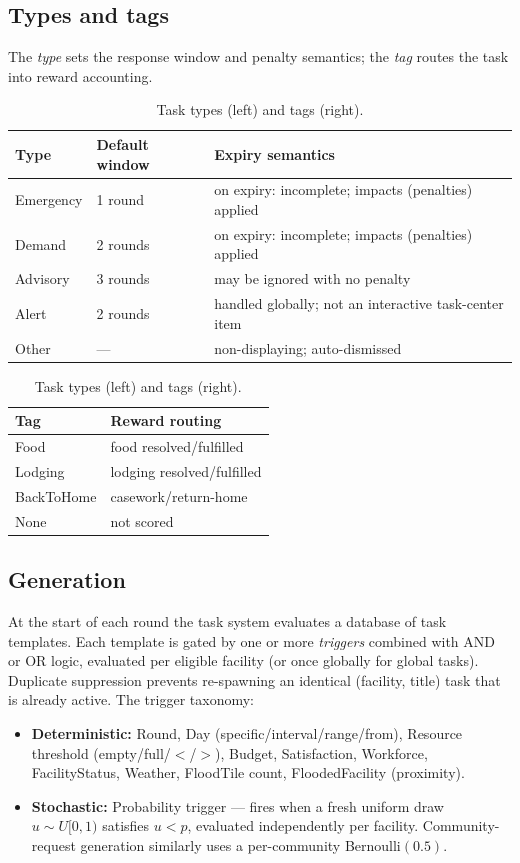 \documentclass[11pt]{article}
\begin{document}
\subsection{Types and tags}
The \emph{type} sets the response window and penalty semantics; the \emph{tag}
routes the task into reward accounting.

\begin{table}[h]
\centering\small
\begin{tabular}{@{}lll@{}}
\toprule
Type & Default window & Expiry semantics \\
\midrule
Emergency & 1 round & on expiry: incomplete; impacts (penalties) applied \\
Demand    & 2 rounds & on expiry: incomplete; impacts (penalties) applied \\
Advisory  & 3 rounds & may be ignored with no penalty \\
Alert     & 2 rounds & handled globally; not an interactive task-center item \\
Other     & --- & non-displaying; auto-dismissed \\
\bottomrule
\end{tabular}
\quad
\begin{tabular}{@{}ll@{}}
\toprule
Tag & Reward routing \\
\midrule
Food & food resolved/fulfilled \\
Lodging & lodging resolved/fulfilled \\
BackToHome & casework/return-home \\
None & not scored \\
\bottomrule
\end{tabular}
\caption{Task types (left) and tags (right).}
\label{tab:tasktypes}
\end{table}

\subsection{Generation}
At the start of each round the task system evaluates a database of task
templates. Each template is gated by one or more \emph{triggers} combined with
AND or OR logic, evaluated per eligible facility (or once globally for global
tasks). Duplicate suppression prevents re-spawning an identical
(facility, title) task that is already active. The trigger taxonomy:

\begin{itemize}[nosep]
\item \textbf{Deterministic:} Round, Day (specific/interval/range/from),
  Resource threshold (empty/full/$<$/$>$), Budget, Satisfaction, Workforce,
  FacilityStatus, Weather, FloodTile count, FloodedFacility (proximity).
\item \textbf{Stochastic:} Probability trigger --- fires when a fresh uniform
  draw $u \sim U[0,1)$ satisfies $u < p$, evaluated independently per facility.
  Community-request generation similarly uses a per-community Bernoulli$(0.5)$.
\end{itemize}
\end{document}
